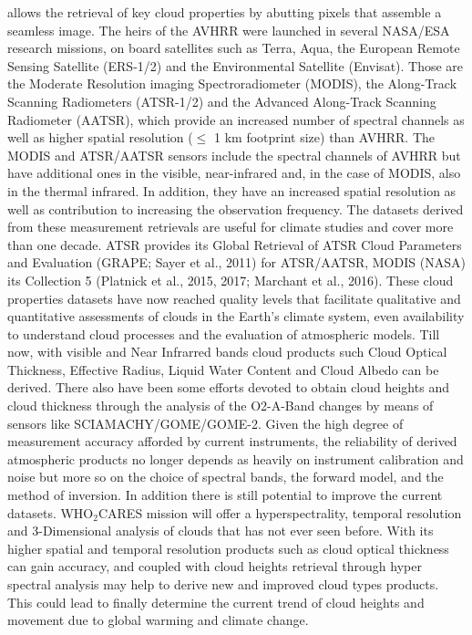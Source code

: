 \documentclass{scrartcl}
\newcommand{\whocares}{WHO$_2$CARES }
\begin{document}
allows the retrieval of key cloud properties by abutting pixels that assemble a
seamless image. The heirs of the AVHRR were launched in several NASA/ESA
research missions, on board satellites such as Terra, Aqua, the European Remote
Sensing Satellite (ERS-1/2) and the Environmental Satellite (Envisat). Those are
the Moderate Resolution imaging Spectroradiometer (MODIS), the Along-Track
Scanning Radiometers (ATSR-1/2) and the Advanced Along-Track Scanning Radiometer
(AATSR), which provide an increased number of spectral channels as well as
higher spatial resolution ($\leq$ 1 km footprint size) than AVHRR. The MODIS and
ATSR/AATSR sensors include the spectral channels of AVHRR but have additional
ones in the visible, near-infrared and, in the case of MODIS, also in the
thermal infrared. In addition, they have an increased spatial resolution as well
as contribution to increasing the observation frequency. The datasets derived
from these measurement retrievals are useful for climate studies and cover more
than one decade. ATSR provides its Global Retrieval of ATSR Cloud Parameters and
Evaluation (GRAPE; Sayer et al., 2011) for ATSR/AATSR, MODIS (NASA) its
Collection 5 (Platnick et al., 2015, 2017; Marchant et al., 2016). These cloud
properties datasets have now reached quality levels that facilitate qualitative
and quantitative assessments of clouds in the Earth’s climate system, even
availability to understand cloud processes and the evaluation of atmospheric
models. Till now, with visible and Near Infrarred bands cloud products such
Cloud Optical Thickness, Effective Radius, Liquid Water Content and Cloud Albedo
can be derived. There also have been some efforts devoted to obtain cloud
heights and cloud thickness through the analysis of the O2-A-Band changes by
means of sensors like SCIAMACHY/GOME/GOME-2. Given the high degree of
measurement accuracy afforded by current instruments, the reliability of derived
atmospheric products no longer depends as heavily on instrument calibration and
noise but more so on the choice of spectral bands, the forward model, and the
method of inversion. In addition there is still potential to improve the current
datasets. \whocares mission will offer a hyperspectrality, temporal resolution
and 3-Dimensional analysis of clouds that has not ever seen before. With its
higher spatial and temporal resolution products such as cloud optical thickness
can gain accuracy, and coupled with cloud heights retrieval through hyper
spectral analysis may help to derive new and improved cloud types products. This
could lead to finally determine the current trend of cloud heights and movement
due to global warming and climate change.
\end{document}
